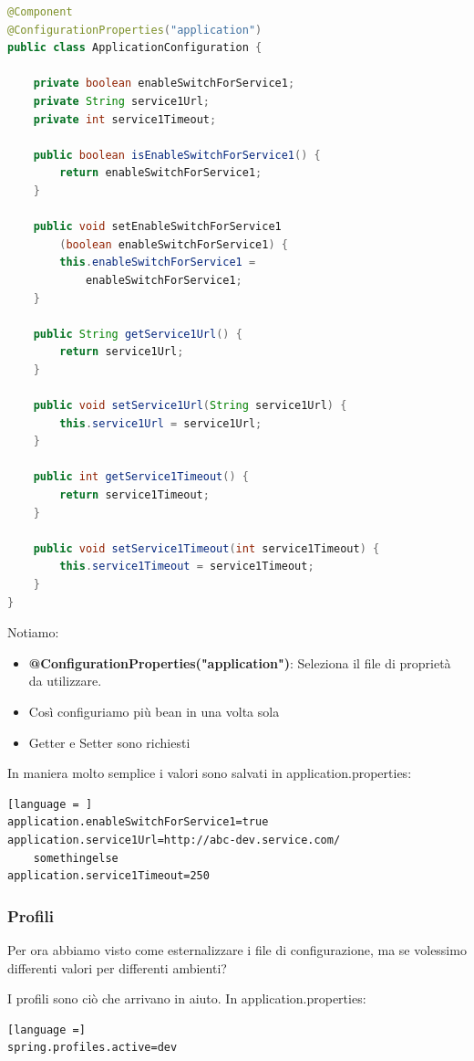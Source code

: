 \documentclass[11pt,a4paper]{book}
\begin{document}
\begin{lstlisting}[language = Java]
@Component
@ConfigurationProperties("application")
public class ApplicationConfiguration {
	
	private boolean enableSwitchForService1;
	private String service1Url;
	private int service1Timeout;

	public boolean isEnableSwitchForService1() {
		return enableSwitchForService1;
	}
	
	public void setEnableSwitchForService1
		(boolean enableSwitchForService1) {
		this.enableSwitchForService1 =
			enableSwitchForService1;
	}
	
	public String getService1Url() {
		return service1Url;
	}

	public void setService1Url(String service1Url) {
		this.service1Url = service1Url;
	}

	public int getService1Timeout() {
		return service1Timeout;
	}

	public void setService1Timeout(int service1Timeout) {
		this.service1Timeout = service1Timeout;
	}
}
\end{lstlisting}

Notiamo:
\begin{itemize}
	\item \textbf{@ConfigurationProperties("application")}: Seleziona il file di proprietà da utilizzare. 
	\item Così configuriamo più bean in una volta sola
	\item Getter e Setter sono richiesti
\end{itemize}

In maniera molto semplice i valori sono salvati in application.properties:
\begin{lstlisting}[language = ]
application.enableSwitchForService1=true
application.service1Url=http://abc-dev.service.com/
	somethingelse
application.service1Timeout=250
\end{lstlisting}

\subsubsection{Profili}
Per ora abbiamo visto come esternalizzare i file di configurazione, ma se volessimo differenti valori per differenti ambienti?

I profili sono ciò che arrivano in aiuto. In application.properties:
\begin{lstlisting}[language =]
spring.profiles.active=dev
\end{lstlisting}
\end{document}

